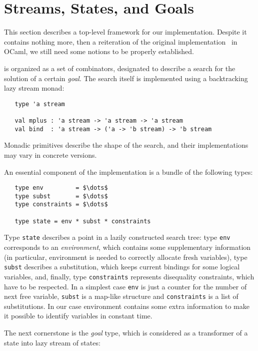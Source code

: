 \section{Streams, States, and Goals}
\label{sec:goals}

This section describes a top-level framework for our implementation. Despite it contains
nothing more, then a reiteration of the original implementation~\cite{MicroKanren, CKanren} 
in OCaml, we still need some notions to be properly established.

\miniKanren is organized as a set of combinators, designated to describe a search for
the solution of a certain \emph{goal}. The search itself is implemented using a
backtracking lazy stream monad:

\begin{lstlisting}
   type 'a stream

   val mplus : 'a stream -> 'a stream -> 'a stream
   val bind  : 'a stream -> ('a -> 'b stream) -> 'b stream
\end{lstlisting}

Monadic primitives describe the shape of the search, and their implementations may 
vary in concrete \miniKanren versions.

An essential component of the implementation is a bundle of the following types:

\begin{lstlisting}
   type env         = $\dots$
   type subst       = $\dots$
   type constraints = $\dots$

   type state = env * subst * constraints
\end{lstlisting}

Type \lstinline{state} describes a point in a lazily constructed search tree: type \lstinline{env} corresponds 
to an \emph{environment}, which contains some supplementary information (in particular, environment is needed to
correctly allocate fresh variables), type \lstinline{subst} describes a substitution, which keeps current bindings 
for some logical variables, and, finally, type \lstinline{constraints} represents disequality constraints, 
which have to be respected. In a simplest case \lstinline{env} is just a counter for the number of next free
variable, \lstinline{subst} is a map-like structure and \lstinline{constraints} is a list of substitutions. In our
case environment contains some extra information to make it possible to identify variables in constant time.

The next cornerstone is the \emph{goal} type, which is considered as a transformer of a state into 
lazy stream of states:

